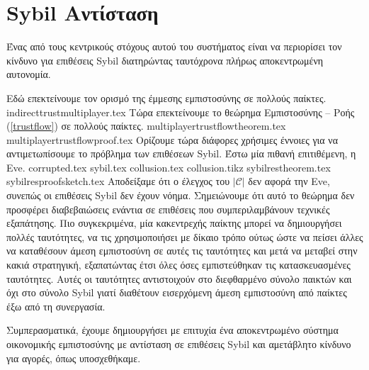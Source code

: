\section{\textlatin{Sybil} Αντίσταση}
  Ένας από τους κεντρικούς στόχους αυτού του συστήματος είναι να περιορίσει τον κίνδυνο για επιθέσεις \textlatin{Sybil}
  διατηρώντας ταυτόχρονα πλήρως αποκεντρωμένη αυτονομία.

  Εδώ επεκτείνουμε τον ορισμό της έμμεσης εμπιστοσύνης σε πολλούς παίκτες.
  {indirecttrustmultiplayer.tex}
  Τώρα επεκτείνουμε το θεώρημα Εμπιστοσύνης -- Ροής (\ref{trustflow}) σε πολλούς παίκτες.
  \newpage
  {multiplayertrustflowtheorem.tex}
  {multiplayertrustflowproof.tex}
  Ορίζουμε τώρα διάφορες χρήσιμες έννοιες για να αντιμετωπίσουμε το πρόβλημα των επιθέσεων \textlatin{Sybil}. Έστω μία πιθανή
  επιτιθέμενη, η \textlatin{Eve}.
  {corrupted.tex}
  {sybil.tex}
  {collusion.tex}
  {collusion.tikz}
  {sybilrestheorem.tex}
  {sybilresproofsketch.tex}
  Αποδείξαμε ότι ο έλεγχος του $|\mathcal{C}|$ δεν αφορά την \textlatin{Eve}, συνεπώς οι επιθέσεις \textlatin{Sybil} δεν έχουν
  νόημα. Σημειώνουμε ότι αυτό το θεώρημα δεν προσφέρει διαβεβαιώσεις ενάντια σε επιθέσεις που συμπεριλαμβάνουν τεχνικές
  εξαπάτησης. Πιο συγκεκριμένα, μία κακεντρεχής παίκτης μπορεί να δημιουργήσει πολλές ταυτότητες, να τις χρησιμοποιήσει με
  δίκαιο τρόπο ούτως ώστε να πείσει άλλες να καταθέσουν άμεση εμπιστοσύνη σε αυτές τις ταυτότητες και μετά να μεταβεί στην
  κακιά στρατηγική, εξαπατώντας έτσι όλες όσες εμπιστεύθηκαν τις κατασκευασμένες ταυτότητες. Αυτές οι ταυτότητες αντιστοιχούν
  στο διεφθαρμένο σύνολο παικτών και όχι στο σύνολο \textlatin{Sybil} γιατί διαθέτουν εισερχόμενη άμεση εμπιστοσύνη από
  παίκτες έξω από τη συνεργασία.

  Συμπερασματικά, έχουμε δημιουργήσει με επιτυχία ένα αποκεντρωμένο σύστημα οικονομικής εμπιστοσύνης με αντίσταση σε επιθέσεις
  \textlatin{Sybil} και αμετάβλητο κίνδυνο για αγορές, όπως υποσχεθήκαμε.

